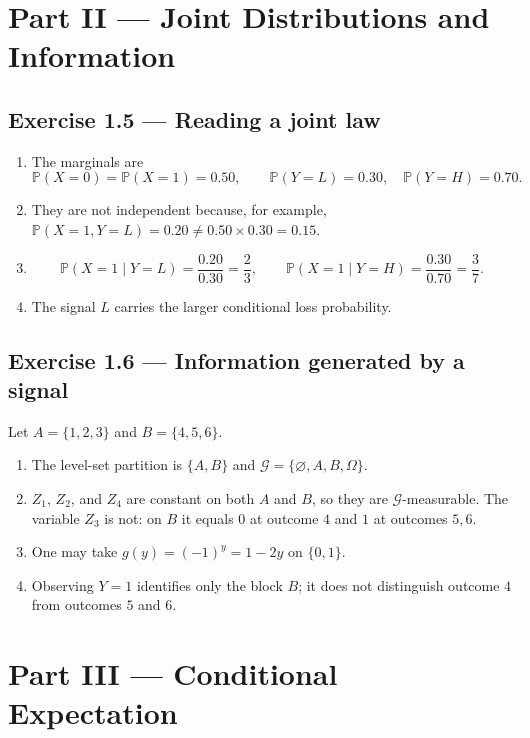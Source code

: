 \documentclass[11pt]{article}
\newcommand{\Pb}{\mathbb{P}}
\newcommand{\1}{\mathbf{1}}
\begin{document}
\section*{Part II --- Joint Distributions and Information}

\subsection*{Exercise 1.5 --- Reading a joint law}
\begin{enumerate}
  \item The marginals are
  \[
  \Pb(X=0)=\Pb(X=1)=0.50,
  \qquad
  \Pb(Y=L)=0.30,
  \quad
  \Pb(Y=H)=0.70.
  \]
  \item They are not independent because, for example,
  $\Pb(X=1,Y=L)=0.20\ne0.50\times0.30=0.15$.
  \item
  \[
  \Pb(X=1\mid Y=L)=\frac{0.20}{0.30}=\frac23,
  \qquad
  \Pb(X=1\mid Y=H)=\frac{0.30}{0.70}=\frac37.
  \]
  \item The signal $L$ carries the larger conditional loss probability.
\end{enumerate}

\subsection*{Exercise 1.6 --- Information generated by a signal}
Let $A=\{1,2,3\}$ and $B=\{4,5,6\}$.
\begin{enumerate}
  \item The level-set partition is $\{A,B\}$ and
  $\mathcal G=\{\varnothing,A,B,\Omega\}$.
  \item $Z_1$, $Z_2$, and $Z_4$ are constant on both $A$ and $B$, so they are
  $\mathcal G$-measurable. The variable $Z_3$ is not: on $B$ it equals $0$ at
  outcome $4$ and $1$ at outcomes $5,6$.
  \item One may take $g(y)=(-1)^y=1-2y$ on $\{0,1\}$.
  \item Observing $Y=1$ identifies only the block $B$; it does not distinguish
  outcome $4$ from outcomes $5$ and $6$.
\end{enumerate}

\section*{Part III --- Conditional Expectation}
\end{document}
